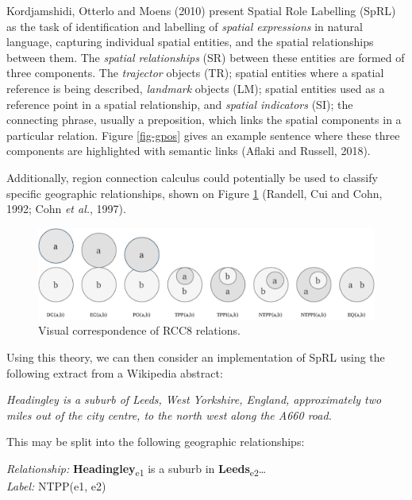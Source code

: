 \documentclass[
  letterpaper,
  11pt,
  english,
  onehalfspacing,
  headsepline]{MastersDoctoralThesis}
\begin{document}
Kordjamshidi, Otterlo and Moens (2010) present Spatial Role Labelling
(SpRL) as the task of identification and labelling of \emph{spatial
expressions} in natural language, capturing individual spatial entities,
and the spatial relationships between them. The \emph{spatial
relationships} (SR) between these entities are formed of three
components. The \emph{trajector} objects (TR); spatial entities where a
spatial reference is being described, \emph{landmark} objects (LM);
spatial entities used as a reference point in a spatial relationship,
and \emph{spatial indicators} (SI); the connecting phrase, usually a
preposition, which links the spatial components in a particular
relation. Figure \ref{fig-gpos} gives an example sentence where these
three components are highlighted with semantic links (Aflaki and
Russell, 2018).



Additionally, region connection calculus could potentially be used to
classify specific geographic relationships, shown on Figure
\ref{fig-rcc} (Randell, Cui and Cohn, 1992; Cohn \emph{et al.}, 1997).

\begin{figure}

{\centering \includegraphics{06_conclusion/./06_figures/rcc.pdf}

}

\caption{\label{fig-rcc}Visual correspondence of RCC8 relations.}

\end{figure}

Using this theory, we can then consider an implementation of SpRL using
the following extract from a Wikipedia abstract:

\emph{Headingley is a suburb of Leeds, West Yorkshire, England,
approximately two miles out of the city centre, to the north west along
the A660 road.}

This may be split into the following geographic relationships:

\emph{Relationship:} \textbf{Headingley}\textsubscript{e1} is a suburb
in \textbf{Leeds}\textsubscript{e2}\ldots{}\\
\emph{Label:} NTPP(e1, e2)
\end{document}
